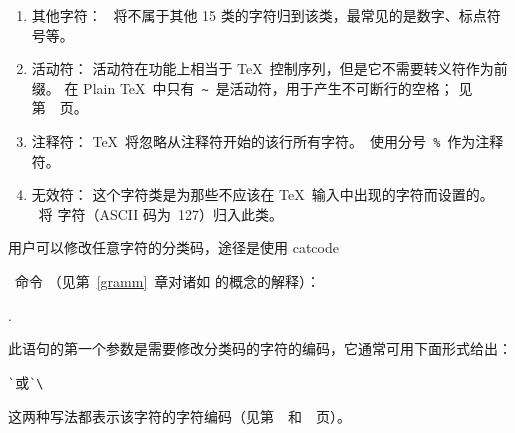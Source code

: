 \documentclass{book}
\begin{document}
\begin{enumerate}
\item{}\label{ini:other}其他字符：
\IniTeX\ 将不属于其他 15 类的字符归到该类，最常见的是数字、标点符号等。

\item{}活动符：
活动符在功能上相当于 \TeX\ 控制序列，但是它不需要转义符作为前缀。
在 Plain \TeX\ 中只有~\verb-~-~是活动符，用于产生不可断行的空格；
见第~\pageref{tie}~页。

\item{}\label{ini:comm}注释符：
\TeX\ 将忽略从注释符开始的该行所有字符。\IniTeX\ 使用分号~\verb-%-~作为注释符。

\item{}\label{ini:invalid}无效符：
这个字符类是为那些不应该在 \TeX\ 输入中出现的字符而设置的。
\IniTeX\ 将  字符（ASCII 码为~127）归入此类。
\end{enumerate}

用户可以修改任意字符的分类码，途径是使用 \csterm catcode\par\ 命令%
（见第~\ref{gramm}~章对诸如  的概念的解释）：
\begin{disp}.\end{disp}
此语句的第一个参数是需要修改分类码的字符的编码，它通常可用下面形式给出：
\begin{disp}\verb>`>\quad 或\quad \verb>`\>\end{disp}
这两种写法都表示该字符的字符编码（见第~\pageref{char:code}~和~\pageref{int:denotation}~页）。
\end{document}
